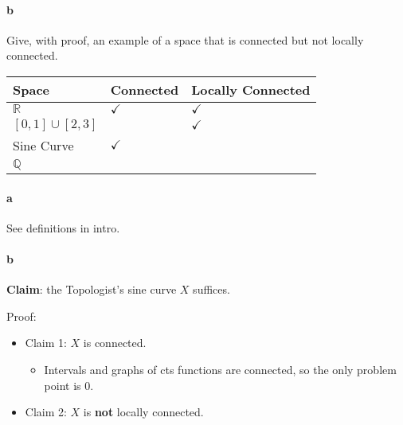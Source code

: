 \hypertarget{b-2}{%
\paragraph{b}\label{b-2}}

Give, with proof, an example of a space that is connected but not
locally connected.


\begin{solution}

\hfill

\begin{concept}

\hfill

\begin{longtable}[]{@{}lll@{}}
\toprule
Space & Connected & Locally Connected\tabularnewline
\midrule
\endhead
\({\mathbb{R}}\) & \(\checkmark\) & \(\checkmark\)\tabularnewline
\([0, 1] \cup[2, 3]\) & & \(\checkmark\)\tabularnewline
Sine Curve & \(\checkmark\) &\tabularnewline
\({\mathbb{Q}}\) & &\tabularnewline
\bottomrule
\end{longtable}

\end{concept}

\hypertarget{a-3}{%
\paragraph{a}\label{a-3}}

See definitions in intro.

\hypertarget{b-3}{%
\paragraph{b}\label{b-3}}

\textbf{Claim}: the Topologist's sine curve \(X\) suffices.

Proof:

\begin{itemize}
\tightlist
\item
  Claim 1: \(X\) is connected.

  \begin{itemize}
  \tightlist
  \item
    Intervals and graphs of cts functions are connected, so the only
    problem point is \(0\).
  \end{itemize}
\item
  Claim 2: \(X\) is \textbf{not} locally connected.


\end{itemize}
\end{solution}
